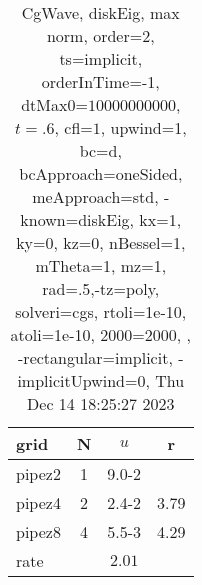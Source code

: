 \begin{table}[H]\tableFont %
\begin{center}
\begin{tabular}{|l|c|c|c|} \hline 
grid  & N &  $ u $ & r \\ \hline 
    pipez2 &     1 & \num{9.0}{-2} &        \\ \hline
    pipez4 &     2 & \num{2.4}{-2} &  3.79  \\ \hline
    pipez8 &     4 & \num{5.5}{-3} &  4.29  \\ \hline
    rate             &       &  $2.01$       &       \\ \hline
\end{tabular}
\caption{CgWave, diskEig, max norm, order=$2$, ts=implicit, orderInTime=-1, dtMax0=$10000000000$, $t=.6$, cfl=$1$, upwind=1, bc=d, bcApproach=oneSided, meApproach=std, -known=diskEig, kx=1, ky=0, kz=0, nBessel=1, mTheta=1, mz=1, rad=.5,-tz=poly, solveri=cgs, rtoli=1e-10, atoli=1e-10, 2000=2000, , -rectangular=implicit, -implicitUpwind=0, Thu Dec 14 18:25:27 2023}\label{table:diskEigOrder2max}
\end{center}
\end{table}

